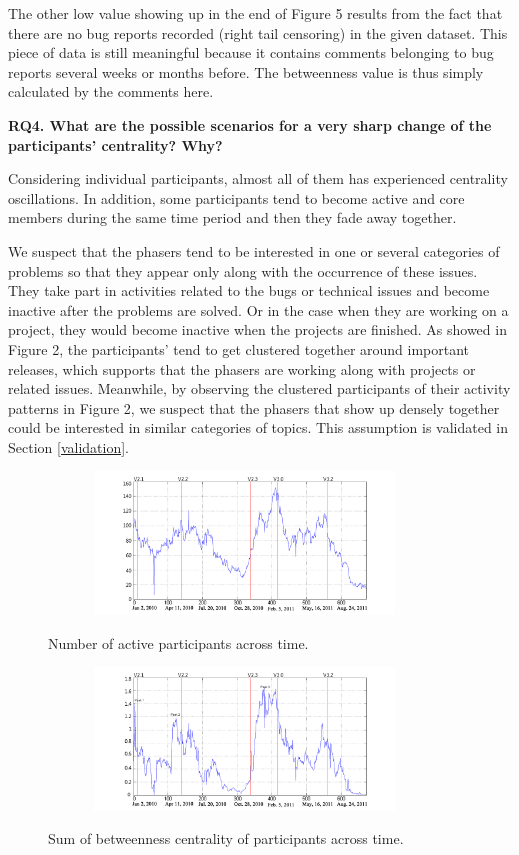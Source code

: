 \documentclass[conference]{IEEEtran}
\begin{document}
The other low value showing up in the end of Figure 5 results from
the fact that there are no bug reports recorded (right tail censoring) in the given dataset.
This piece of data is still meaningful because it contains comments belonging to bug reports several weeks or months before. The betweenness value is thus simply calculated by the comments here. 


\textbf{RQ4. What are the possible scenarios for a very sharp change of the participants' centrality? Why?}

Considering individual participants, almost all of them has
experienced centrality oscillations. In addition, some participants
tend to become active and core members during the same time
period and then they fade away together.


We suspect that the phasers tend to be interested in one or several
categories of problems so that they appear only along with the
occurrence of these issues. They take part in activities related to
the bugs or technical issues and become inactive after the problems are
solved. Or in the case when they are working on a project, they would become inactive when the projects are finished. 
As showed in Figure 2, the participants' tend to get clustered together around important releases, which supports that the phasers are working along with projects or related issues.
Meanwhile, by observing the clustered participants of their
activity patterns in Figure 2, we suspect that the phasers that show
up densely together could be interested in similar categories of
topics. 
This assumption is validated in Section
\ref{validation}. 


\begin{figure}[!t]
\centerline{\includegraphics[width=4.1in, height = 3.8cm]{people.png}
\label{people}}
\caption{Number of active participants across time.}
\end{figure}

\begin{figure}[!t]
\centerline{\includegraphics[width=4.1in, height = 3.8cm]{betweenness.png}
\label{betweenness}}
\caption{Sum of betweenness centrality of participants across time.}
\end{figure}
\end{document}
